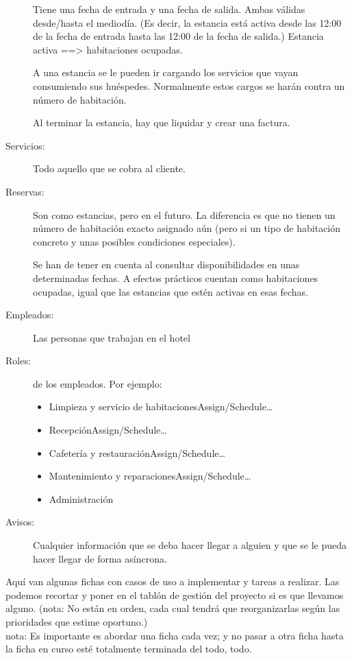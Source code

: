 \documentclass[spanish,12pt,a4paper,final,oneside]{book}
\begin{document}
\begin{description}
Tiene una fecha de entrada y una fecha de salida. Ambas válidas desde/hasta el mediodía. (Es decir, la estancia está activa desde las 12:00 de la fecha de entrada hasta las 12:00 de la fecha de salida.)
Estancia activa ==> habitaciones ocupadas.

A una estancia se le pueden ir cargando los servicios que vayan consumiendo sus huéspedes. Normalmente estos cargos se harán contra un número de habitación.

Al terminar la estancia, hay que liquidar y crear una factura.


\item[Servicios:] Todo aquello que se cobra al cliente.
 

\item[Reservas:] Son como estancias, pero en el futuro. La diferencia es que no tienen un número de habitación exacto asignado aún (pero si un tipo de habitación concreto y unas posibles condiciones especiales).

Se han de tener en cuenta al consultar disponibilidades en unas determinadas fechas. A efectos prácticos cuentan como habitaciones ocupadas, igual que las estancias que estén activas en esas fechas.

\item[Empleados:] Las personas que trabajan en el hotel

\item[Roles:] de los empleados.
Por ejemplo:
\begin{itemize}
\item Limpieza y servicio de habitacionesAssign/Schedule…
\item RecepciónAssign/Schedule…
\item Cafetería y restauraciónAssign/Schedule…
\item Mantenimiento y reparacionesAssign/Schedule…
\item Administración
\end{itemize}

\item[Avisos:] Cualquier información que se deba hacer llegar a alguien
y que se le pueda hacer llegar de forma asíncrona.

\end{description}


\vspace{2cm}

Aquí van algunas fichas con casos de uso a implementar y tareas a realizar. Las podemos recortar y poner en el tablón de gestión del proyecto si es que llevamos alguno. (nota: No están en orden, cada cual tendrá que reorganizarlas según las prioridades que estime oportuno.)
\\nota: Es importante es abordar una ficha cada vez; y no pasar a otra ficha hasta la ficha en curso esté totalmente terminada del todo, todo.
\end{document}
